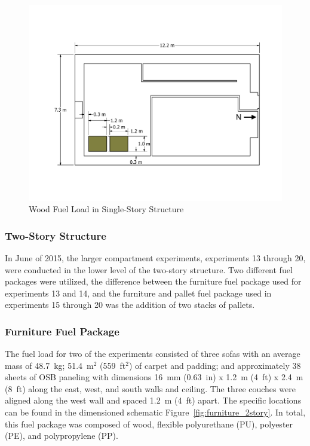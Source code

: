 \documentclass[12pt,oneside]{book}
\begin{document}
\begin{figure}[!ht]
	\includegraphics[width=.8\columnwidth]{../Figures/Floor_Plans/PDFs/East_Structure/DelCo_2012_East_Structure_Pallets}
	\caption{Wood Fuel Load in Single-Story Structure}
	\label{fig:Wood_Fuel_Load_Dimensions}
\end{figure}


\subsubsection*{Two-Story Structure}
\label{sec:suppresion_two}

In June of 2015, the larger compartment experiments, experiments 13 through 20, were conducted in the lower level of the two-story structure.  Two different fuel packages were utilized, the difference between the furniture fuel package used for experiments 13 and 14, and the furniture and pallet fuel package used in experiments 15 through 20 was the addition of two stacks of pallets.   

\subsubsection{Furniture Fuel Package}
\label{sec:fire_suppression_furniture_fuel_2}

The fuel load for two of the experiments consisted of three sofas with an average mass of 48.7~kg; 51.4~m$^2$ (559~ft$^2$) of carpet and padding; and approximately 38 sheets of OSB paneling with dimensions 16~mm (0.63~in) x 1.2~m (4~ft) x 2.4~m (8~ft) along the east, west, and south walls and ceiling. The three couches were aligned along the west wall and spaced 1.2~m (4~ft) apart. The specific locations can be found in the dimensioned schematic Figure~\ref{fig:furniture_2story}. In total, this fuel package was composed of wood, flexible polyurethane (PU), polyester (PE), and polypropylene (PP).
\end{document}
